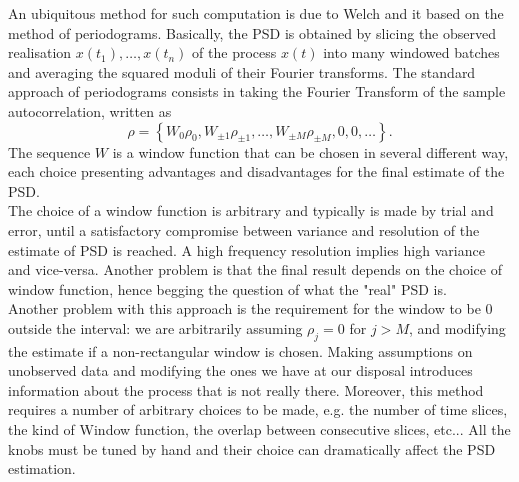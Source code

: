 \documentclass[twocolumn,showpacs,preprintnumbers,nofootinbib,prd,
superscriptaddress,10pt]{revtex4-1}
\begin{document}
An ubiquitous method for such computation is due to Welch \cite{Welch} and it based on the method of periodograms. Basically, the PSD is obtained by slicing the observed realisation $x(t_1),\ldots,x(t_n)$ of the process $x(t)$ into many windowed batches and averaging the squared moduli of their Fourier transforms. The standard approach of periodograms \cite{Lomb,Scargle} consists in taking the Fourier Transform of the sample autocorrelation, written as \begin{equation}
    \rho = \left\{W_0\rho_0,W_{\pm 1}\rho_{\pm 1}, \dots, W_{\pm M}\rho_{\pm M}, 0, 0, \dots \right\}.
\end{equation}
The sequence $W$ is a window function that can be chosen in several different way, each choice presenting advantages and disadvantages for the final estimate of the PSD. \\ 
The choice of a window function is arbitrary and typically is made by trial and error, until a satisfactory compromise between variance and resolution of the estimate of PSD is reached. A high frequency resolution implies high variance and vice-versa. Another problem is that the final result depends on the choice of window function, hence begging the question of what the "real" PSD is. \\  
Another problem with this approach is the requirement for the window to be $0$ outside the interval: we are arbitrarily assuming $\rho_j = 0$ for $j > M$, and modifying the estimate if a non-rectangular window is chosen. Making assumptions on unobserved data and modifying the ones we have at our disposal introduces information about the process that is not really there. Moreover, this method requires a number of arbitrary choices to be made, e.g. the number of time slices, the kind of Window function, the overlap between consecutive slices, etc... All the knobs must be tuned by hand and their choice can dramatically affect the PSD estimation.
\end{document}
